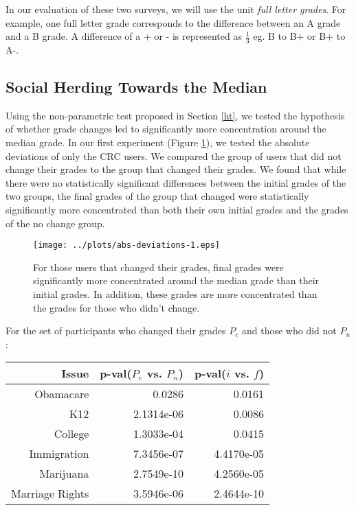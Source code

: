 In our evaluation of these two surveys, we will use the unit \emph{full letter grades}.
For example, one full letter grade corresponds to the difference between an A grade and a B grade. 
A difference of a + or - is represented as $\frac{1}{3}$ eg. B to B+ or B+ to A-. 

\subsection{Social Herding Towards the Median}
Using the non-parametric test proposed in Section \ref{ht}, we tested the hypothesis of whether grade changes led to significantly more concentration around the median grade.
In our first experiment (Figure \ref{mdev-1}), we tested the absolute deviations of only the CRC users.
We compared the group of users that did not change their grades to the group that changed their grades.
We found that while there were no statistically significant differences between the initial grades of the two groups, the final grades of the group that changed were statistically significantly more concentrated than both their own initial grades and the grades of the no change group.
\begin{figure}[h]
  \centering
    \texttt{[image: ../plots/abs-deviations-1.eps]}
      \caption{For those users that changed their grades, final grades were significantly more concentrated around the median grade than their initial grades. In addition, these grades are more concentrated than the grades for those who didn't change.}
      \label{mdev-1}
\end{figure}

For the set of participants who changed their grades $P_c$ and those who did not $P_n$:

\begin{tabular}[!ht] { r | r | r }
\label{dev-2}
  Issue & p-val($P_c$ vs. $P_n$) & p-val($i$ vs. $f$) \\
  \hline
  \hline
  Obamacare &  0.0286 & 0.0161 \\
  \hline
  K12 & 2.1314e-06 &  0.0086 \\
  \hline
  College & 1.3033e-04 & 0.0415 \\
  \hline
  Immigration & 7.3456e-07 &4.4170e-05\\
  \hline
  Marijuana & 2.7549e-10 & 4.2560e-05\\
  \hline
  Marriage Rights & 3.5946e-06 & 2.4644e-10 \\
\end{tabular}

